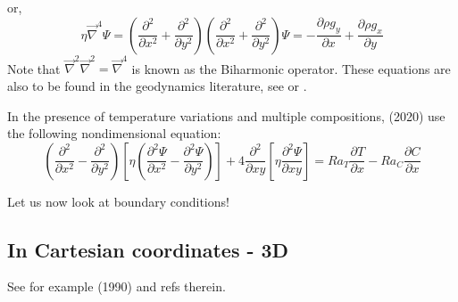 or, 
\begin{equation}
\eta {\vec \nabla}^4 \Psi 
=
\left(\frac{\partial^2 }{\partial x^2} + \frac{\partial^2 }{\partial y^2} \right) 
\left(\frac{\partial^2 }{\partial x^2} + \frac{\partial^2 }{\partial y^2} \right) \Psi
=
-\frac{\partial \rho g_y}{\partial x} + \frac{\partial \rho g_x}{\partial y}   
\label{eq:sf1}
\end{equation}
Note that $\vec\nabla^2 \vec\nabla^2 = \vec\nabla^4 $ is known as the {\color{olive}Biharmonic operator}.
These equations are also to be found in the geodynamics literature, 
see \textcite[eq. 1.43]{tack10} or \textcite[p 70-71]{gery10}.

In the presence of temperature variations and multiple compositions, 
\textcite{trlb20} (2020)  use the  following nondimensional equation:
\[
\left(
\frac{\partial^2 }{\partial x^2} - 
\frac{\partial^2 }{\partial y^2}  
\right)
\left[ \eta
\left(
\frac{\partial^2 \Psi}{\partial x^2} - 
\frac{\partial^2 \Psi}{\partial y^2}  
\right)
\right]
+4
\frac{\partial^2 }{\partial xy} 
\left[
\eta 
\frac{\partial^2 \Psi}{\partial xy} 
\right]
=
Ra_T \frac{\partial T}{\partial x}-
Ra_C \frac{\partial C}{\partial x}
\]




Let us now look at boundary conditions!


\subsection{In Cartesian coordinates - 3D}

See for example \textcite{hous90} (1990) and refs therein.


